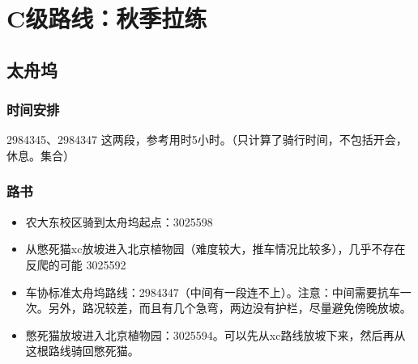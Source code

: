 \documentclass{ctexbook}
\begin{document}
\section{C级路线：秋季拉练}
\subsection{太舟坞}
\subsubsection{时间安排}
2984345、2984347 这两段，参考用时5小时。（只计算了骑行时间，不包括开会，休息。集合）
\subsubsection{路书}
\begin{itemize}
    \item 农大东校区骑到太舟坞起点：3025598
    \item 从憋死猫xc放坡进入北京植物园（难度较大，推车情况比较多），几乎不存在反爬的可能 3025592
    \item 车协标准太舟坞路线：2984347（中间有一段连不上）。注意：中间需要抗车一次。另外，路况较差，而且有几个急弯，两边没有护栏，尽量避免傍晚放坡。
    \item 憋死猫放坡进入北京植物园：3025594。可以先从xc路线放坡下来，然后再从这根路线骑回憋死猫。
\end{itemize}
\end{document}
